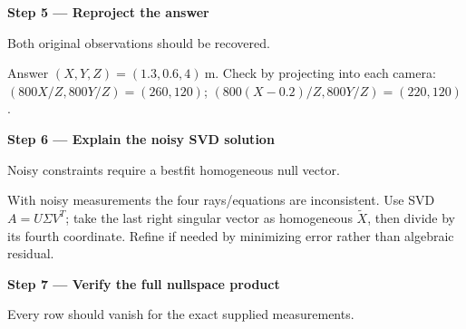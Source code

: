 \documentclass[letterpaper,11pt,english,openany,oneside]{jupyterBook}
\begin{document}
\par

\par\medskip{}
{\color{QuizStepRed}\bfseries Step 5 — Reproject the answer}\par\smallskip

\sphinxAtStartPar
{} Both original observations should be recovered.

\sphinxAtStartPar
Answer {\color{QuizMathBlue} \(\boxed{(X,Y,Z)=(1.3,0.6,4)\ \mathrm m}\)}. Check by projecting into each camera: {\color{QuizMathBlue} \((800X/Z,800Y/Z)=(260,120)\)}; {\color{QuizMathBlue} \((800(X-0.2)/Z,800Y/Z)=(220,120)\)}.

\par

\par\medskip{}
{\color{QuizStepRed}\bfseries Step 6 — Explain the noisy SVD solution}\par\smallskip

\sphinxAtStartPar
{} Noisy constraints require a best\sphinxhyphen{}fit homogeneous null vector.

\sphinxAtStartPar
With noisy measurements the four rays/equations are inconsistent. Use SVD {\color{QuizMathBlue} \(A=U\Sigma V^T\)}; take the last right singular vector as homogeneous {\color{QuizMathBlue} \(\widetilde X\)}, then divide by its fourth coordinate. Refine if needed by minimizing  error rather than algebraic residual.

\par

\par\medskip{}
{\color{QuizStepRed}\bfseries Step 7 — Verify the full nullspace product}\par\smallskip

\sphinxAtStartPar
{} Every row should vanish for the exact supplied measurements.
\end{document}
